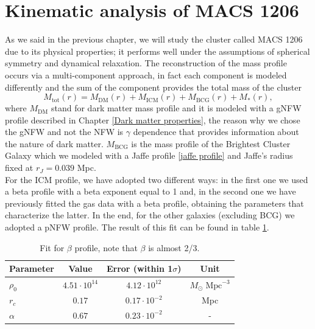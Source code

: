 \section{Kinematic analysis of MACS 1206}
As we said in the previous chapter, we will study the cluster called MACS 1206 due to its physical properties; it performs well under the assumptions of spherical symmetry and dynamical relaxation.
The reconstruction of the mass profile occurs via a multi-component approach, in fact each component is modeled differently and the sum of the component provides the total mass of the cluster
\begin{equation}
    M_{\text{tot}} (r) = M_{\text{DM}} (r) + M_{\text{ICM}} (r) + M_{\text{BCG}} (r) + M_{*} (r),  
\end{equation}
where $M_{\text{DM}}$ stand for dark matter mass profile and it is modeled with a gNFW profile described in Chapter \ref{Dark matter properties}, the reason why we chose the gNFW and not the NFW is $\gamma$ dependence that provides information about the nature of dark matter. $M_{\text{BCG}}$ is the mass profile of the Brightest Cluster Galaxy which we modeled with a Jaffe profile \eqref{jaffe profile} and Jaffe's radius fixed at $r_J = 0.039$ Mpc.\\ For the ICM profile, we have adopted two different ways: in the first one we used a beta profile with a beta exponent equal to 1 and, in the second one we have previously fitted the gas data with a beta profile, obtaining the parameters that characterize the latter. In the end, for the other galaxies (excluding BCG) we adopted a pNFW profile. The result of this fit can be found in table \ref{tab:fit beta model}.

\begin{table}[h!]
    \centering
    \begin{tabular}{@{}lccc@{}}
        \toprule
        \textbf{Parameter} & \textbf{Value} & \textbf{Error (within 1$\sigma$)} & \textbf{Unit}\\
        \midrule
        $\rho_0$       & $4.51 \cdot 10^{14}$ & $4.12 \cdot 10^{12}$    & $M_\odot \; \text{Mpc}^{-3}$\\
        $r_c$          & $0.17$               & $0.17 \cdot 10^{-2}$     & Mpc\\
        $\alpha$       & $0.67$               & $0.23 \cdot 10^{-2}$     & - \\
        \bottomrule
    \end{tabular}
    \caption[Fit for $\beta$ profile]{Fit for $\beta$ profile, note that $\beta$ is almost 2/3.}
    \label{tab:fit beta model}
\end{table}



